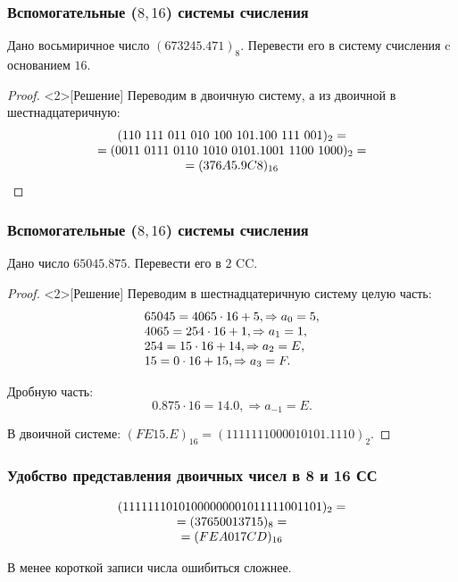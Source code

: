 \begin{frame}
    \frametitle{Вспомогательные ($8,16$) системы счисления}
    
    \begin{example}[Задача]
        Дано восьмиричное число $(673245.471)_8$. Перевести его в систему счисления c основанием $16$.
    \end{example}
    \begin{proof}<2>[Решение]
        Переводим в двоичную систему, а из двоичной в шестнадцатеричную:
        \[
            \begin{array}[c]{c}
                (110\ 111\ 011\ 010\ 100\ 101.100\ 111\ 001)_2=\\
                =(0011\ 0111\ 0110\ 1010\ 0101.1001\ 1100\ 1000)_2=\\
                =(376A5.9C8)_{16}
            \end{array}
        \]
    \end{proof}
\end{frame}

\begin{frame}
    \frametitle{Вспомогательные ($8,16$) системы счисления}

    \begin{example}[Задача]
        Дано число $65045.875$. Перевести его в $2$ CC.
    \end{example}
    \begin{proof}<2>[Решение]
        Переводим в шестнадцатеричную систему целую часть:
        \[
            \begin{array}[c]{l}
                65045=4065\cdot 16 + 5,\Rightarrow a_{0}=5, \\
                4065=254\cdot 16 + 1,\Rightarrow a_{1}=1, \\
                254=15\cdot 16 + 14,\Rightarrow a_{2}=E, \\
                15=0\cdot 16 + 15,\Rightarrow a_{3}=F.
            \end{array}
        \]

        Дробную часть:
        \[
            0.875\cdot 16=14.0,\Rightarrow a_{-1}=E.
        \]

        В двоичной системе: $(FE15.E)_{16}=(1111111000010101.1110)_2$.
    \end{proof}
\end{frame}

\begin{frame}
    \frametitle{Удобство представления двоичных чисел в 8 и 16 СС}
    
    \begin{example}
        \[
            \begin{array}[c]{c}
                (11111110101000000001011111001101)_2=\\
                =(37650013715)_8=\\
                =(FEA017CD)_{16}
            \end{array}
        \]
        
        В менее короткой записи числа ошибиться сложнее.
    \end{example}
\end{frame}



